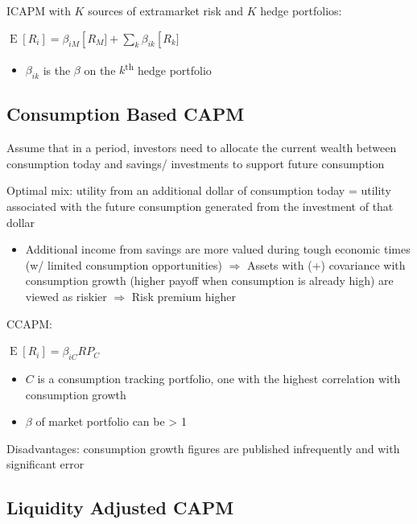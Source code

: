 \documentclass[]{book}
\providecommand{\tightlist}{%
  \setlength{\itemsep}{0pt}\setlength{\parskip}{0pt}}
\theoremstyle{definition}
\theoremstyle{definition}
\theoremstyle{remark}
\begin{document}
ICAPM with \(K\) sources of extramarket risk and \(K\) hedge portfolios:

\(\operatorname{E}[R_i] = \beta_{iM}\operatorname[R_M] + \sum_k \beta_{ik}\operatorname[R_k]\)

\begin{itemize}
\tightlist
\item
  \(\beta_{ik}\) is the \(\beta\) on the \(k\)\textsuperscript{th} hedge
  portfolio
\end{itemize}

\subsection{Consumption Based CAPM}\label{consumption-based-capm}

Assume that in a period, investors need to allocate the current wealth
between consumption today and savings/ investments to support future
consumption

Optimal mix: utility from an additional dollar of consumption today =
utility associated with the future consumption generated from the
investment of that dollar

\begin{itemize}
\tightlist
\item
  Additional income from savings are more valued during tough economic
  times (w/ limited consumption opportunities) \(\Rightarrow\) Assets
  with (+) covariance with consumption growth (higher payoff when
  consumption is already high) are viewed as riskier \(\Rightarrow\)
  Risk premium higher
\end{itemize}

CCAPM:

\(\operatorname{E}[R_i] = \beta_{iC}RP_C\)

\begin{itemize}
\item
  \(C\) is a consumption tracking portfolio, one with the highest
  correlation with consumption growth
\item
  \(\beta\) of market portfolio can be \textgreater{} 1
\end{itemize}

Disadvantages: consumption growth figures are published infrequently and
with significant error

\subsection{Liquidity Adjusted CAPM}\label{liquidity-adjusted-capm}
\end{document}
